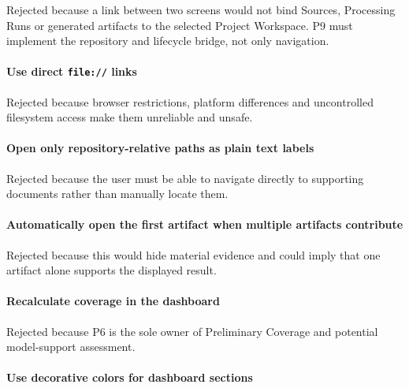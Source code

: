 Rejected because a link between two screens would not bind Sources, Processing Runs or generated artifacts to the selected Project Workspace. P9 must implement the repository and lifecycle bridge, not only navigation.

\hypertarget{use-direct-file-links}{%
\paragraph{\texorpdfstring{Use direct \texttt{file://} links}{Use direct file:// links}}\label{use-direct-file-links}}

Rejected because browser restrictions, platform differences and uncontrolled filesystem access make them unreliable and unsafe.

\hypertarget{open-only-repository-relative-paths-as-plain-text-labels}{%
\paragraph{Open only repository-relative paths as plain text labels}\label{open-only-repository-relative-paths-as-plain-text-labels}}

Rejected because the user must be able to navigate directly to supporting documents rather than manually locate them.

\hypertarget{automatically-open-the-first-artifact-when-multiple-artifacts-contribute}{%
\paragraph{Automatically open the first artifact when multiple artifacts contribute}\label{automatically-open-the-first-artifact-when-multiple-artifacts-contribute}}

Rejected because this would hide material evidence and could imply that one artifact alone supports the displayed result.

\hypertarget{recalculate-coverage-in-the-dashboard}{%
\paragraph{Recalculate coverage in the dashboard}\label{recalculate-coverage-in-the-dashboard}}

Rejected because P6 is the sole owner of Preliminary Coverage and potential model-support assessment.

\hypertarget{use-decorative-colors-for-dashboard-sections}{%
\paragraph{Use decorative colors for dashboard sections}\label{use-decorative-colors-for-dashboard-sections}}

